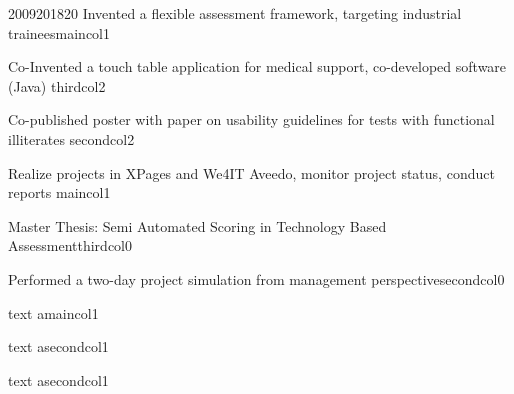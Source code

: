 \documentclass[10pt,A4]{article}
\begin{document}
\begin{minipage}{0.4\textwidth}
\begin{center}
\begin{cvtimeline}{2009}{2018}{20}{\linewidth}
    {Invented a flexible assessment framework, targeting industrial trainees}{maincol}{1}

    {Co-Invented a touch table application for medical support, co-developed software (Java) }
    {thirdcol}{2}

    {Co-published poster with paper on usability guidelines for tests with functional illiterates}
    {secondcol}{2}

    {Realize projects in XPages and We4IT Aveedo, monitor project status, conduct reports}
    {maincol}{1}

    {Master Thesis: Semi Automated Scoring in Technology Based Assessment}{thirdcol}{0}

    {Performed a two-day project simulation from management perspective}{secondcol}{0}

    {text a}{maincol}{1}
    
    {text a}{secondcol}{1}
    
    {text a}{secondcol}{1}
        
\end{cvtimeline}
\end{center}
\end{minipage}
%
%
%
%
%
%
\end{document}
